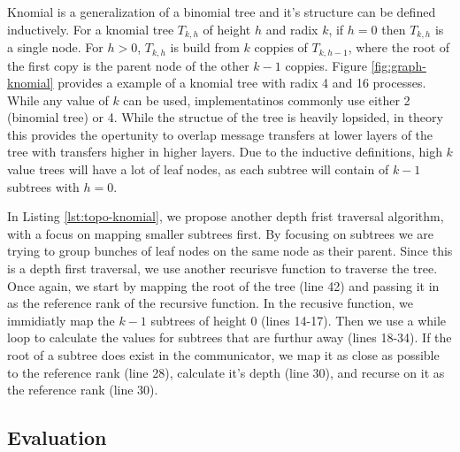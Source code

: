 
\lstset{label = lst:topo-knomial}
\lstset{caption = Heuristic for rank reordering knomial trees.}


Knomial is a generalization of a binomial tree and it's structure can be defined inductively.
For a knomial tree $T_{k,h}$ of height $h$ and radix $k$, if $h=0$ then $T_{k,h}$ is a single node. For $h>0$, $T_{k,h}$ is build from $k$ coppies of $T_{k,h-1}$, where the root of the first copy is the parent node of the other $k-1$ coppies.
Figure \ref{fig:graph-knomial} provides a example of a knomial tree with radix 4 and 16 processes.
While any value of $k$ can be used, implementatinos commonly use either 2 (binomial tree) or 4. 
While the structue of the tree is heavily lopsided, in theory this provides the opertunity to overlap message transfers at lower layers of the tree with transfers higher in higher layers.
Due to the inductive definitions, high $k$ value trees will have a lot of leaf nodes, as each subtree will contain of $k-1$ subtrees with $h=0$.

In Listing \ref{lst:topo-knomial}, we propose another depth frist traversal algorithm, with a focus on mapping smaller subtrees first.
By focusing on subtrees we are trying to group bunches of leaf nodes on the same node as their parent.
Since this is a depth first traversal, we use another recurisve function to traverse the tree. 
Once again, we start by mapping the root of the tree (line 42) and passing it in as the reference rank of the recursive function.
In the recusive function, we immidiatly map the $k-1$ subtrees of height 0 (lines 14-17).
Then we use a while loop to calculate the values for subtrees that are furthur away (lines 18-34).
If the root of a subtree does exist in the communicator, we map it as close as possible to the reference rank (line 28), calculate it's depth (line 30), and recurse on it as the reference rank (line 30).

\subsection{Evaluation}

